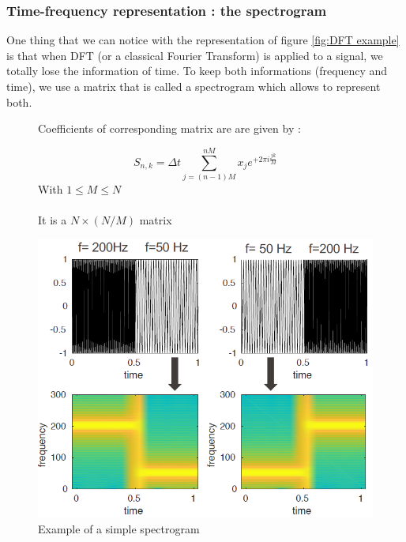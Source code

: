 \newpage
\subsubsection{Time-frequency representation : the spectrogram}

One thing that we can notice with the representation of figure \ref{fig:DFT example} is that when DFT (or a classical Fourier Transform) is applied to a signal, we totally lose the information of time. To keep both informations (frequency and time), we use a matrix that is called a spectrogram which allows to represent both. 

\begin{figure}[h]
\begin{minipage}{0.4\textwidth}
    Coefficients of corresponding matrix are are given by : 

    \begin{equation*}
        S_{n,k}=\Delta t \sum_{j=(n-1)M} ^{nM} x_j e^{+2\pi i \frac{j k}{M}}
    \end{equation*}
    With \(1\leq M \leq N\)

    \paragraph{}
    It is a \(N \times (N/M)\) matrix 
\end{minipage}
\begin{minipage}{0.6\textwidth}
\centering
\includegraphics[scale=0.5]{Figures Cours Traitement du Signal/Exemples spectrogrames.png}
\caption{Example of a simple spectrogram}
\label{fig:spectrogram_example}
    
\end{minipage}
\end{figure}

